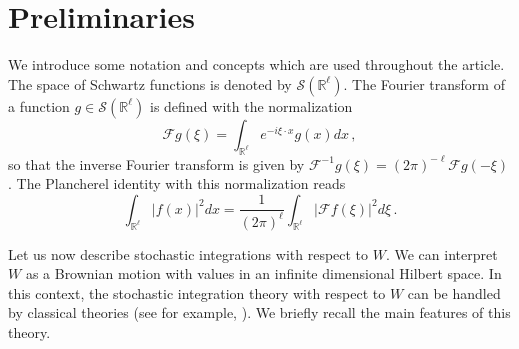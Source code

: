 \documentclass[12pt,reqno]{amsart}
\theoremstyle{remark}
\let\Section=\section
\def\section{\setcounter{equation}{0}\Section}
\newcommand{\1}{\mathbf{1}}
\def\RR{\mathbb{R}}
\def\css{{\mathcal S}}
\def\cff{{\mathcal F}}
\begin{document}
\section{Preliminaries} %
\label{sec:preliminary}
	We introduce some notation and concepts which are used throughout the article.
	The space of Schwartz functions is denoted by $\css(\RR^\ell)$. The Fourier transform of a function $g\in\css(\RR^\ell)$ is defined with the normalization
	\begin{equation*}
		\cff g(\xi)=\int_{\RR^\ell}e^{-i \xi\cdot x}g(x)dx\,,
	\end{equation*} 
	so that the inverse Fourier transform is given by $\cff^{-1}g(\xi)=(2 \pi)^{-\ell}\cff g(- \xi)$. The Plancherel identity with this normalization reads
	\begin{equation*}
		\int_{\RR^\ell}|f(x)|^2dx=\frac1{(2 \pi)^\ell}\int_{\RR^\ell}|\cff f(\xi)|^2 d \xi\,.
	\end{equation*}

	Let us now describe stochastic integrations with respect to $W$. We can interpret  $W$   as a Brownian motion with values in an infinite dimensional Hilbert space. In this context,  the stochastic integration theory with respect to $W$ can be handled by classical theories (see for example, \cite{DQ}).
		We briefly recall the main   features of this theory.
\end{document}
